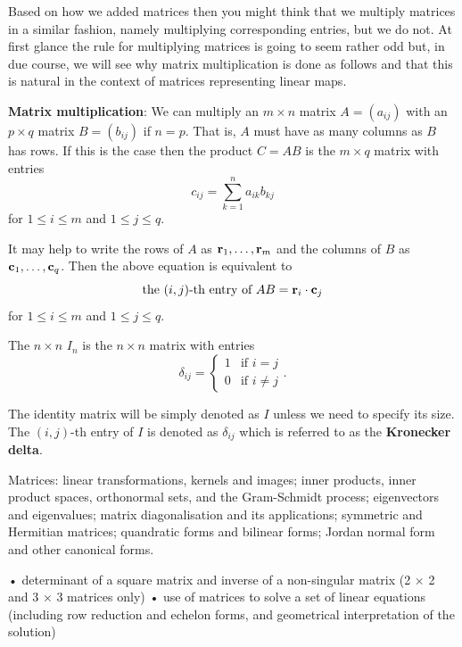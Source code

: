 Based on how we added matrices then you might think that we multiply matrices in a similar fashion, namely multiplying corresponding entries, but we do not. At first glance the rule for multiplying matrices is going to seem rather odd but, in due course, we will see why matrix multiplication is done as follows and that this is natural in the context of matrices representing linear maps.

\textbf{Matrix multiplication}: We can multiply an $m\times n$ matrix $A=(a_{ij})$ with an $p\times q$ matrix $B=(b_{ij})$ if $n=p$. That is, $A$ must have as many columns as $B$ has rows. If this is the case then the product $C=AB$ is the $m\times q$ matrix with entries
\begin{equation}
c_{ij}=\sum_{k=1}^n a_{ik}b_{kj}
\end{equation}
for $1\le i\le m$ and $1\le j\le q$.

It may help to write the rows of $A$ as $\vb{r}_1,\dots,\vb{r}_m$ and the columns of $B$ as $\vb{c}_1,\dots,\vb{c}_q$. Then the above equation is equivalent to
\[ \text{the }(i,j)\text{-th entry of }AB=\vb{r}_i\cdot\vb{c}_j \]
for $1\le i\le m$ and $1\le j\le q$.

\begin{definition}
The $n\times n$  $I_n$ is the $n\times n$ matrix with entries
\[ \delta_{ij}=\begin{cases}
1 & \text{if }i=j \\
0 & \text{if }i\neq j
\end{cases}. \]
\end{definition}

The identity matrix will be simply denoted as $I$ unless we need to specify its size. The $(i,j)$-th entry of $I$ is denoted as $\delta_{ij}$ which is referred to as the \textbf{Kronecker delta}.



Matrices: linear transformations, kernels and images; inner products, inner product spaces, orthonormal sets, and the Gram-Schmidt process; eigenvectors and eigenvalues; matrix diagonalisation and its applications; symmetric and Hermitian matrices; quandratic forms and bilinear forms; Jordan normal form and other canonical forms.

• determinant of a square matrix and inverse of a non-singular matrix (2 × 2 and 3 × 3 matrices only)
• use of matrices to solve a set of linear equations (including row reduction and echelon forms, and geometrical interpretation of the solution)

